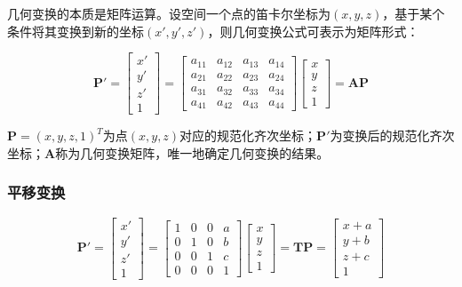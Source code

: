 \documentclass[cn, blue, normal, 12pt]{elegantnote}
\begin{document}
几何变换的本质是矩阵运算。设空间一个点的笛卡尔坐标为$(x,y,z)$，基于某个条件将其变换到新的坐标$(x',y',z')$，则几何变换公式可表示为矩阵形式：

\begin{equation}
    \bm{P'}=\left[
        \begin{array}{c}
            x' \\ y' \\ z' \\ 1
        \end{array}
    \right]=\left[
        \begin{array}{cccc}
            a_{11} & a_{12} & a_{13} & a_{14} \\
            a_{21} & a_{22} & a_{23} & a_{24} \\
            a_{31} & a_{32} & a_{33} & a_{34} \\
            a_{41} & a_{42} & a_{43} & a_{44}
        \end{array}
    \right]\left[
        \begin{array}{c}
            x \\ y \\ z \\ 1
        \end{array}
    \right]=\bm{AP}
\end{equation}

$\bm{P}=(x,y,z,1)^T$为点$(x,y,z)$对应的规范化齐次坐标；$\bm{P'}$为变换后的规范化齐次坐标；$\bm{A}$称为几何变换矩阵，唯一地确定几何变换的结果。

\subsubsection{平移变换}

\begin{equation}
    \bm{P'}=\left[
        \begin{array}{c}
            x' \\ y' \\ z' \\ 1
        \end{array}
    \right]=\left[
        \begin{array}{cccc}
            1 & 0 & 0 & a \\
            0 & 1 & 0 & b \\
            0 & 0 & 1 & c \\
            0 & 0 & 0 & 1
        \end{array}
    \right]\left[
        \begin{array}{c}
            x \\ y \\ z \\ 1
        \end{array}
    \right]=\bm{TP}=\left[
        \begin{array}{c}
            x+a \\ y+b \\ z+c \\ 1
        \end{array}
    \right]
\end{equation}
\end{document}
